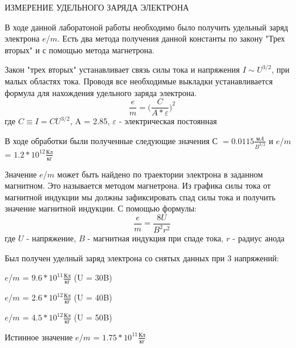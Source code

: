 \documentclass{article}
\begin{document}
	\Russian
	\begin{center}
		ИЗМЕРЕНИЕ УДЕЛЬНОГО ЗАРЯДА ЭЛЕКТРОНА
	\end{center}
	В ходе данной лаборатоной работы необходимо было получить удельный заряд электрона $e$/$m$. Есть два метода получения данной константы по закону "Трех вторых" и с помощью метода магнетрона. 
	
	Закон "трех вторых" устанавливает связь силы тока и напряжения $I \sim U^{3/2}$, при малых областях тока. Проводя все необходимые выкладки устанавливается формула для нахождения удельного заряда электрона.
	\begin{equation}
		\frac{e}{m} = \biggl(\frac{C}{A*\varepsilon}\biggl)^2
	\end{equation}
	где $C \equiv I=CU^{3/2}$, A = 2.85, $\varepsilon$ - электрическая постоянная
	
	В ходе обработки были полученные следующие значения С $= 0.0115 \frac{мA}{B^{3/2}}$ и $e$/$m$ = $1.2*10^{12}\frac{\text{Кл}}{\text{кг}}$
	
	Значение $e$/$m$ может быть найдено по траектории электрона в заданном магнитном. Это называется методом магнетрона. Из графика силы тока от магнитной индукции мы должны зафиксировать спад силы тока и получить значение магнитной индукции. С помощью формулы:
	\begin{equation}
		\frac{e}{m} = \frac{8U}{B^2r^2}
	\end{equation}
	где $U$ - напряжение, $B$ - магнитная индукция при спаде тока, $r$ - радиус анода
	
	Был получен уделный заряд электрона со снятых данных при 3 напряжений:
	
	$e$/$m$ = $9.6*10^{11}\frac{\text{Кл}}{\text{кг}}$ (U = 30B)
	
	$e$/$m$ = $2.6*10^{12}\frac{\text{Кл}}{\text{кг}}$ (U = 40B)
	
	$e$/$m$ = $4.5*10^{12}\frac{\text{Кл}}{\text{кг}}$ (U = 50B)
	
	Истинное значение $e$/$m$ = $1.75*10^{11}\frac{\text{Кл}}{\text{кг}}$
	
	 
\end{document}
